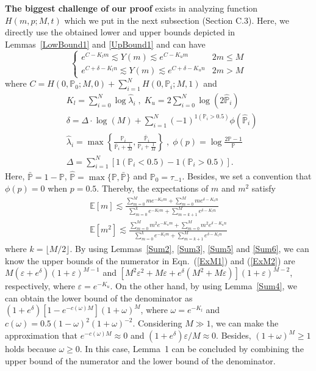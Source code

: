 \documentclass{article}
\begin{document}
\textbf{The biggest challenge of our proof} exists in analyzing function $H(m,p;M,t)$ which we put in the next subsection (Section C.3).
Here, we directly use the obtained lower and upper bounds  depicted in Lemmas~\ref{LowBound1} and \ref{UpBound1} and can have
\begin{equation}
\left\{
\begin{array}{lc}
e^{C-{K}_l m}\lesssim Y(m) \lesssim e^{C-K_u m} & 2m\leq M\\
e^{C+\delta-{K}_l  n}\lesssim Y(m) \lesssim e^{C+\delta-K_u n} & 2m>M
\end{array}
\right.
\end{equation}
where $C=H(0,\mathbb{P}_0;M,0)+\sum_{i=1}^{N}H(0,\mathbb{P}_i;M,1)$ and
\begin{equation*}
\begin{split}
&K_l = {\sum}_{i=0}^{N}\log \hat{\lambda}_{i}\;,\; K_u =  2{\sum}_{i=0}^{N}\log \left(2\hat{\mathbb{P}}_i\right)\\
&\delta = \Delta\cdot \log(M)+{\sum}_{i=1}^{N}(-1)^{1(\mathbb{P}_i>0.5)}\phi(\hat{\mathbb{P}}_i)\\
&\hat{\lambda}_i=\max\left\{\frac{\mathbb{P}_i}{\bar{\mathbb{P}}_i+\frac{1}{M}},\frac{\bar{\mathbb{P}}_i}{\mathbb{P}_i+\frac{1}{M}}\right\}
\;,\;\phi (p) =\log\frac{2\mathbb{P}-1}{\mathbb{P}}\\
&\Delta={\sum}_{i=1}^N[1(\mathbb{P}_i<0.5)-1(\mathbb{P}_i>0.5)].
\end{split}
\end{equation*}
Here, $\bar{\mathbb{P}}=1-\mathbb{P}$, $\hat{\mathbb{P}}=\max \{\mathbb{P}, \bar{\mathbb{P}}\}$ and $\mathbb{P}_0=\tau_{-1}$. Besides, we set a convention that $\phi(p)=0$ when $p=0.5$. Thereby, the expectations of $m$ and $m^2$ satisfy
\begin{align}
\mathbb{E}[m] \lesssim \frac{\sum_{m=0}^{M}me^{-K_u m}+\sum_{m=0}^{M}me^{\delta-K_u n}}{\sum_{m=0}^{k}e^{-K_l m}+\sum_{m=k+1}^{M}e^{\delta-K_l n}}
\label{ExM1}\\
\mathbb{E}[m^2] \lesssim \frac{\sum_{m=0}^{M}m^2e^{-K_u m}+\sum_{m=0}^{M}m^2e^{\delta-K_u n}}{\sum_{m=0}^{k}e^{-K_l m}+\sum_{m=k+1}^{M}e^{\delta-K_l n}} \label{ExM2}
\end{align}
where $k=\lfloor M/2 \rfloor$.
By using Lemmas~\ref{Sum2}, \ref{Sum3}, \ref{Sum5} and \ref{Sum6}, we can know the upper bounds of the numerator in Eqn.~(\ref{ExM1}) and (\ref{ExM2}) are $M(\varepsilon+e^{\delta})(1+\varepsilon)^{M-1}$ and $[M^2\varepsilon^2+M\varepsilon+e^{\delta}(M^2+M\varepsilon)](1+\varepsilon)^{M-2}$, respectively, where $\varepsilon=e^{-K_u}$. On the other hand, by using Lemma~\ref{Sum4}, we can obtain the lower bound of the denominator as $(1+e^{\delta})[1-e^{-c(\omega)M}](1+\omega)^{M}$, where $\omega=e^{-K_l}$ and $c(\omega)=0.5(1-\omega)^2(1+\omega)^{-2}$.
Considering $M\gg 1$, we can make the approximation that $e^{-c(\omega)M}\approx 0$ and $(1+e^\delta)\varepsilon/M\approx 0$. Besides, $(1+\omega)^{M}\geq 1$ holds because $\omega\geq 0$. In this case, Lemma~1 can be concluded by combining the upper bound of the numerator and the lower bound of the denominator.
\end{document}
